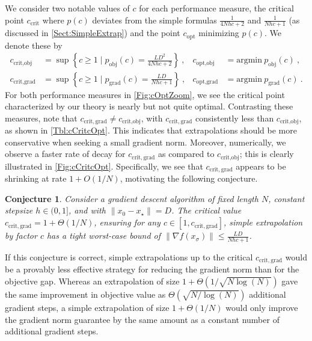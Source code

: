 \documentclass[11pt]{article}
\numberwithin{equation}{section}
\newtheorem{conjecture}[thm]{Conjecture}
\theoremstyle{definition}
\theoremstyle{definition}
\theoremstyle{definition}
\newcommand{\1}{\mathbf{1}}
\newcommand{\xStar}{x_\star}
\newcommand{\xSpecial}{x_\sigma}
\newcommand{\cCrit}{c_\mathrm{crit}}
\newcommand{\cCritGrad}{c_{\mathrm{crit,grad}}}
\newcommand{\cOpt}{c_{\text{opt}}}
\begin{document}
We consider two notable values of $c$ for each performance measure, the critical point $\cCrit$ where $p(c)$ deviates from the simple formulas $\frac{1}{4Nhc+2}$ and $\frac{1}{Nhc+1}$ (as discussed in \cref{Sect:SimpleExtrap}) and the point $\cOpt$ minimizing $p(c)$. We denote these by
\begin{align*}
    c_{\text{crit,obj}} &= \sup\left\{ c\geq 1 \mid p_{\text{obj}}(c) = \frac{LD^2}{4Nhc+2}\right\} \ , &
    c_{\text{opt,obj}} &= \mathrm{argmin\ } p_{\text{obj}}(c) \ , \\
    c_{\text{crit,grad}} &= \sup\left\{ c\geq 1 \mid p_{\text{grad}}(c) = \frac{LD}{Nhc+1}\right\} \ , &
    c_{\text{opt,grad}} &= \mathrm{argmin\ } p_{\text{grad}}(c) \ .
\end{align*}
For both performance measures in \cref{Fig:cOptZoom}, we see the critical point characterized by our theory is nearly but not quite optimal. Contrasting these measures, note that $\cCritGrad \neq c_{\text{crit,obj}}$, with $\cCritGrad$ consistently less than $c_{\text{crit,obj}}$, as shown in \cref{Tbl:cCritcOpt}. This indicates that extrapolations should be more conservative when seeking a small gradient norm. Moreover, numerically, we observe a faster rate of decay for $\cCritGrad$ as compared to $c_{\text{crit,obj}}$; this is clearly illustrated in \cref{Fig:cCritcOpt}. Specifically, we see that $\cCritGrad$ appears to be shrinking at rate $1+O(1/N)$, motivating the following conjecture.
\begin{conjecture}\label{Conj:GradNorm}
    Consider a gradient descent algorithm of fixed length $N$, constant stepsize $h \in (0,1]$, and with $\|x_0 - \xStar \| = D$. The critical value $\cCritGrad = 1 +\Theta(1/N)$, ensuring for any $c \in [1,\cCritGrad]$, simple extrapolation by factor $c$ has a tight worst-case bound of $\| \nabla f(\xSpecial)\| \leq \frac{LD}{Nhc+1}$.
\end{conjecture}

If this conjecture is correct, simple extrapolations up to the critical $\cCritGrad$ would be a provably less effective strategy for reducing the gradient norm than for the objective gap. Whereas an extrapolation of size $1+\Theta(1/\sqrt{N\log(N)})$ gave the same improvement in objective value as $\Theta(\sqrt{N/\log(N)})$ additional gradient steps, a simple extrapolation of size $1+\Theta(1/N)$ would only improve the gradient norm guarantee by the same amount as a constant number of additional gradient steps.
\end{document}
